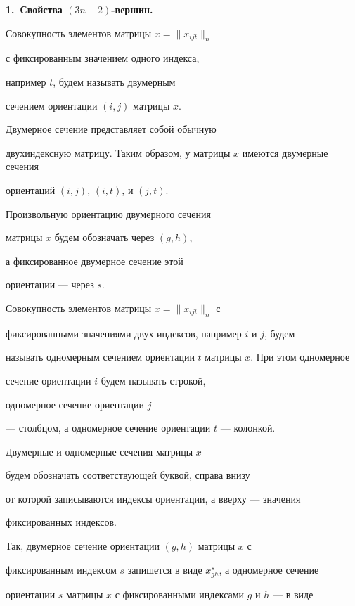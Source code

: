 \medskip





{\bf 1.~Свойства $(3n-2)$-вершин.} 


Совокупность элементов  матрицы $x=\|x_{ijt}\|_n$


с фиксированным значением одного индекса, 


например $t$, будем называть двумерным


сечением ориентации $(i,j)$ матрицы $x$. 


Двумерное сечение представляет собой обычную


двухиндексную матрицу. Таким образом, у матрицы $x$ имеются двумерные сечения


ориентаций $(i,j)$, $(i,t)$, и $(j,t)$.


Произвольную ориентацию двумерного сечения


матрицы $x$ будем обозначать через $(g,h)$,


а фиксированное двумерное сечение этой


ориентации --- через $s$.





Совокупность элементов матрицы $x=\|x_{ijt}\|_n$ с


фиксированными значениями двух индексов, например $i$ и $j$, будем


называть одномерным сечением ориентации $t$ матрицы $x$. При этом одномерное


сечение ориентации $i$ будем называть строкой, 


одномерное сечение ориентации $j$


--- столбцом, а одномерное сечение ориентации $t$ --- колонкой.





Двумерные и одномерные сечения матрицы $x$ 


будем обозначать соответствующей буквой, справа внизу 


от которой записываются индексы ориентации, а вверху --- значения


фиксированных индексов. 


Так, двумерное сечение ориентации $(g,h)$ матрицы $x$ с


фиксированным индексом $s$ запишется в виде $x^s_{gh}$, а одномерное сечение


ориентации $s$ матрицы $x$ с фиксированными индексами $g$ и $h$ --- в виде


